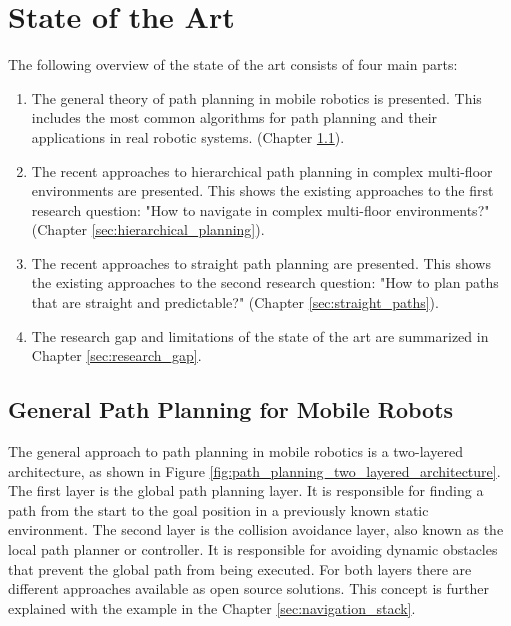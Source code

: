 \chapter{State of the Art}
\label{sec:state_of_the_art}
The following overview of the state of the art consists of four main parts:
\begin{enumerate}
    \item The general theory of path planning in mobile robotics is presented. This includes the most common algorithms for path planning and their applications in real robotic systems. (Chapter \ref{sec:path_planning}).
    \item The recent approaches to hierarchical path planning in complex multi-floor environments are presented. This shows the existing approaches to the first research question: "How to navigate in complex multi-floor environments?" (Chapter \ref{sec:hierarchical_planning}).
    \item The recent approaches to straight path planning are presented. This shows the existing approaches to the second research question: "How to plan paths that are straight and predictable?" (Chapter \ref{sec:straight_paths}).
    \item The research gap and limitations of the state of the art are summarized in Chapter \ref{sec:research_gap}.
\end{enumerate}

\section{General Path Planning for Mobile Robots}
\label{sec:path_planning}
The general approach to path planning in mobile robotics is a two-layered architecture, as shown in Figure \ref{fig:path_planning_two_layered_architecture}. The first layer is the global path planning layer. It is responsible for finding a path from the start to the goal position in a previously known static environment. The second layer is the collision avoidance layer, also known as the local path planner or controller. It is responsible for avoiding dynamic obstacles that prevent the global path from being executed. For both layers there are different approaches available as open source solutions. This concept is further explained with the example in the Chapter \ref{sec:navigation_stack}.

